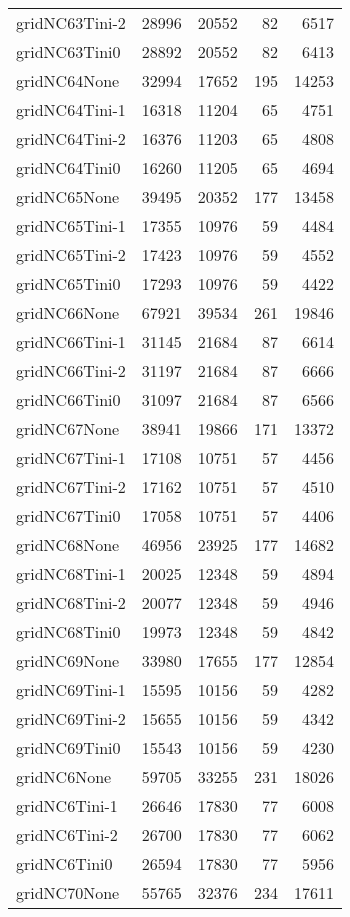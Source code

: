 \begin{longtable}{lrrrr}
gridNC63Tini-2 & 28996 & 20552 & 82 & 6517 \\
gridNC63Tini0 & 28892 & 20552 & 82 & 6413 \\
gridNC64None & 32994 & 17652 & 195 & 14253 \\
gridNC64Tini-1 & 16318 & 11204 & 65 & 4751 \\
gridNC64Tini-2 & 16376 & 11203 & 65 & 4808 \\
gridNC64Tini0 & 16260 & 11205 & 65 & 4694 \\
gridNC65None & 39495 & 20352 & 177 & 13458 \\
gridNC65Tini-1 & 17355 & 10976 & 59 & 4484 \\
gridNC65Tini-2 & 17423 & 10976 & 59 & 4552 \\
gridNC65Tini0 & 17293 & 10976 & 59 & 4422 \\
gridNC66None & 67921 & 39534 & 261 & 19846 \\
gridNC66Tini-1 & 31145 & 21684 & 87 & 6614 \\
gridNC66Tini-2 & 31197 & 21684 & 87 & 6666 \\
gridNC66Tini0 & 31097 & 21684 & 87 & 6566 \\
gridNC67None & 38941 & 19866 & 171 & 13372 \\
gridNC67Tini-1 & 17108 & 10751 & 57 & 4456 \\
gridNC67Tini-2 & 17162 & 10751 & 57 & 4510 \\
gridNC67Tini0 & 17058 & 10751 & 57 & 4406 \\
gridNC68None & 46956 & 23925 & 177 & 14682 \\
gridNC68Tini-1 & 20025 & 12348 & 59 & 4894 \\
gridNC68Tini-2 & 20077 & 12348 & 59 & 4946 \\
gridNC68Tini0 & 19973 & 12348 & 59 & 4842 \\
gridNC69None & 33980 & 17655 & 177 & 12854 \\
gridNC69Tini-1 & 15595 & 10156 & 59 & 4282 \\
gridNC69Tini-2 & 15655 & 10156 & 59 & 4342 \\
gridNC69Tini0 & 15543 & 10156 & 59 & 4230 \\
gridNC6None & 59705 & 33255 & 231 & 18026 \\
gridNC6Tini-1 & 26646 & 17830 & 77 & 6008 \\
gridNC6Tini-2 & 26700 & 17830 & 77 & 6062 \\
gridNC6Tini0 & 26594 & 17830 & 77 & 5956 \\
gridNC70None & 55765 & 32376 & 234 & 17611 \\

\end{longtable}
